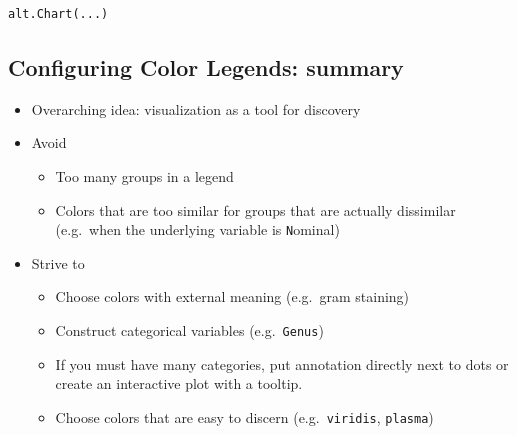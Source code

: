 \documentclass[
  letterpaper,
  DIV=11,
  numbers=noendperiod]{scrartcl}
\providecommand{\tightlist}{%
  \setlength{\itemsep}{0pt}\setlength{\parskip}{0pt}}\usepackage{longtable,booktabs,array}
\begin{document}
\begin{verbatim}
alt.Chart(...)
\end{verbatim}

\subsection{Configuring Color Legends:
summary}\label{configuring-color-legends-summary}

\begin{itemize}
\tightlist
\item
  Overarching idea: visualization as a tool for discovery
\item
  Avoid

  \begin{itemize}
  \tightlist
  \item
    Too many groups in a legend
  \item
    Colors that are too similar for groups that are actually dissimilar
    (e.g.~when the underlying variable is \texttt{N}ominal)\\
  \end{itemize}
\item
  Strive to

  \begin{itemize}
  \tightlist
  \item
    Choose colors with external meaning (e.g.~gram staining)
  \item
    Construct categorical variables (e.g.~\texttt{Genus})
  \item
    If you must have many categories, put annotation directly next to
    dots or create an interactive plot with a tooltip.
  \item
    Choose colors that are easy to discern (e.g.~\texttt{viridis},
    \texttt{plasma})
  \end{itemize}
\end{itemize}
\end{document}
